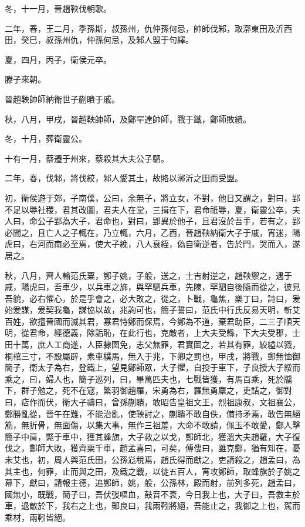 \begin{pinyinscope}
冬，十一月，晉趙鞅伐朝歌。

二年，春，王二月，季孫斯，叔孫州，仇仲孫何忌，帥師伐邾，取漷東田及沂西田，癸巳，叔孫州仇，仲孫何忌，及邾人盟于句繹。

夏，四月，丙子，衛侯元卒。

滕子來朝。

晉趙鞅帥師納衛世子蒯瞶于戚。

秋，八月，甲戌，晉趙鞅帥師，及鄭罕達帥師，戰于鐵，鄭師敗績。

冬，十月，葬衛靈公。

十有一月，蔡遷于州來，蔡殺其大夫公子駟。

二年，春，伐邾，將伐絞，邾人愛其土，故賂以漷沂之田而受盟。

初，衛侯遊于郊，子南僕，公曰，余無子，將立女，不對，他日又謂之，對曰，郢不足以辱社稷，君其改圖，君夫人在堂，三揖在下，君命祇辱，夏，衛靈公卒，夫人曰，命公子郢為大子，君命也，對曰，郢異於他子，且君沒於吾手，若有之，郢必聞之，且亡人之子輒在，乃立輒，六月，乙酉，晉趙鞅納衛大子于戚，宵迷，陽虎曰，右河而南必至焉，使大子絻，八人衰絰，偽自衛逆者，告於門，哭而入，遂居之。

秋，八月，齊人輸范氏粟，鄭子姚，子般，送之，士吉射逆之，趙鞅禦之，遇于戚，陽虎曰，吾車少，以兵車之旆，與罕駟兵車，先陳，罕駟自後隨而從之，彼見吾貌，必右懼心，於是乎會之，必大敗之，從之，卜戰，龜焦，樂丁曰，詩曰，爰始爰謀，爰契我龜，謀協以故，兆詢可也，簡子誓曰，范氏中行氏反易天明，斬艾百姓，欲擅晉國而滅其君，寡君恃鄭而保焉，今鄭為不道，棄君助臣，二三子順天明，從君命，經德義，除詬恥，在此行也，克敵者，上大夫受縣，下大夫受郡，士田十萬，庶人工商遂，人臣隸圉免，志父無罪，君實圖之，若其有罪，絞縊以戮，桐棺三寸，不設屬辟，素車樸馬，無入于兆，下卿之罰也，甲戌，將戰，郵無恤御簡子，衛太子為右，登鐵上，望見鄭師眾，大子懼，自投于車下，子良授大子綏而乘之，曰，婦人也，簡子巡列，曰，畢萬匹夫也，七戰皆獲，有馬百乘，死於牖下，群子勉之，死不在寇，繁羽御趙羅，宋勇為右，羅無勇麇之，吏詰之，御對曰，痁作而伏，衛大子禱曰，曾孫蒯聵，敢昭告皇祖文王，烈祖康叔，文祖襄公，鄭勝亂從，晉午在難，不能治亂，使鞅討之，蒯聵不敢自佚，備持矛焉，敢告無絕筋，無折骨，無面傷，以集大事，無作三祖羞，大命不敢請，佩玉不敢愛，鄭人擊簡子中肩，斃于車中，獲其蜂旗，大子救之以戈，鄭師北，獲溫大夫趙羅，大子復伐之，鄭師大敗，獲齊粟千車，趙孟喜曰，可矣，傅傁曰，雖克鄭，猶有知在，憂未艾也，初，周人與范氏田，公孫尨稅焉，趙氏得而獻之，吏請殺之，趙孟曰，為其主也，何罪，止而與之田，及鐵之戰，以徒五百人，宵攻鄭師，取蜂旗於子姚之幕下，獻曰，請報主德，追鄭師，姚，般，公孫林，殿而射，前列多死，趙孟曰，國無小，既戰，簡子曰，吾伏弢嘔血，鼓音不衰，今日我上也，大子曰，吾救主於車，退敵於下，我右之上也，郵良曰，我兩靷將絕，吾能止之，我御之上也，駕而乘材，兩靷皆絕。


\end{pinyinscope}
